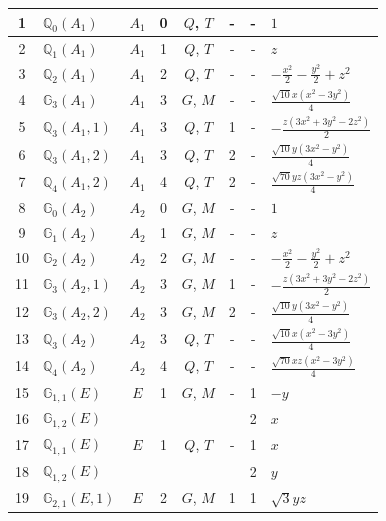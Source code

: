 \documentclass[fleqn,10pt,landscape]{jsarticle}
\begin{document}
\begin{longtable}[l]{clcccccl}
1 & $\mathbb{Q}_{0}(A_{1})$ & $A_{1}$ & 0 & $Q$, $T$ & - & - & $1$ \\ \hline
2 & $\mathbb{Q}_{1}(A_{1})$ & $A_{1}$ & 1 & $Q$, $T$ & - & - & $z$ \\ \hline
3 & $\mathbb{Q}_{2}(A_{1})$ & $A_{1}$ & 2 & $Q$, $T$ & - & - & $- \frac{x^{2}}{2} - \frac{y^{2}}{2} + z^{2}$ \\ \hline
4 & $\mathbb{G}_{3}(A_{1})$ & $A_{1}$ & 3 & $G$, $M$ & - & - & $\frac{\sqrt{10} x \left(x^{2} - 3 y^{2}\right)}{4}$ \\ \hline
5 & $\mathbb{Q}_{3}(A_{1},1)$ & $A_{1}$ & 3 & $Q$, $T$ & 1 & - & $- \frac{z \left(3 x^{2} + 3 y^{2} - 2 z^{2}\right)}{2}$ \\ \hline
6 & $\mathbb{Q}_{3}(A_{1},2)$ & $A_{1}$ & 3 & $Q$, $T$ & 2 & - & $\frac{\sqrt{10} y \left(3 x^{2} - y^{2}\right)}{4}$ \\ \hline
7 & $\mathbb{Q}_{4}(A_{1},2)$ & $A_{1}$ & 4 & $Q$, $T$ & 2 & - & $\frac{\sqrt{70} y z \left(3 x^{2} - y^{2}\right)}{4}$ \\ \hline
8 & $\mathbb{G}_{0}(A_{2})$ & $A_{2}$ & 0 & $G$, $M$ & - & - & $1$ \\ \hline
9 & $\mathbb{G}_{1}(A_{2})$ & $A_{2}$ & 1 & $G$, $M$ & - & - & $z$ \\ \hline
10 & $\mathbb{G}_{2}(A_{2})$ & $A_{2}$ & 2 & $G$, $M$ & - & - & $- \frac{x^{2}}{2} - \frac{y^{2}}{2} + z^{2}$ \\ \hline
11 & $\mathbb{G}_{3}(A_{2},1)$ & $A_{2}$ & 3 & $G$, $M$ & 1 & - & $- \frac{z \left(3 x^{2} + 3 y^{2} - 2 z^{2}\right)}{2}$ \\ \hline
12 & $\mathbb{G}_{3}(A_{2},2)$ & $A_{2}$ & 3 & $G$, $M$ & 2 & - & $\frac{\sqrt{10} y \left(3 x^{2} - y^{2}\right)}{4}$ \\ \hline
13 & $\mathbb{Q}_{3}(A_{2})$ & $A_{2}$ & 3 & $Q$, $T$ & - & - & $\frac{\sqrt{10} x \left(x^{2} - 3 y^{2}\right)}{4}$ \\ \hline
14 & $\mathbb{Q}_{4}(A_{2})$ & $A_{2}$ & 4 & $Q$, $T$ & - & - & $\frac{\sqrt{70} x z \left(x^{2} - 3 y^{2}\right)}{4}$ \\ \hline
15 & $\mathbb{G}_{1,1}(E)$ & $E$ & 1 & $G$, $M$ & - & 1 & $- y$ \\
16 & $\mathbb{G}_{1,2}(E)$ &  &  &  &  & 2 & $x$ \\ \hline
17 & $\mathbb{Q}_{1,1}(E)$ & $E$ & 1 & $Q$, $T$ & - & 1 & $x$ \\
18 & $\mathbb{Q}_{1,2}(E)$ &  &  &  &  & 2 & $y$ \\ \hline
19 & $\mathbb{G}_{2,1}(E,1)$ & $E$ & 2 & $G$, $M$ & 1 & 1 & $\sqrt{3} y z$ \\

\end{longtable}
\end{document}
